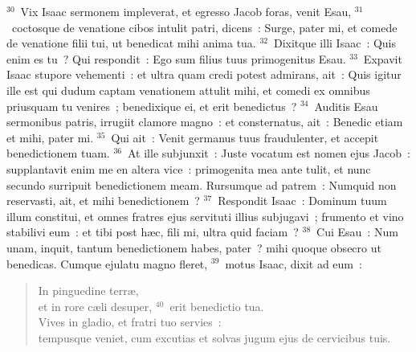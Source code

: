 ${}^{30}$~Vix Isaac sermonem impleverat, et egresso Jacob foras, venit Esau,
${}^{31}$~coctosque de venatione cibos intulit patri, dicens~: Surge, pater mi, et comede de venatione filii tui, ut benedicat mihi anima tua.
${}^{32}$~Dixitque illi Isaac~: Quis enim es tu~? Qui respondit~: Ego sum filius tuus primogenitus Esau.
${}^{33}$~Expavit Isaac stupore vehementi~: et ultra quam credi potest admirans, ait~: Quis igitur ille est qui dudum captam venationem attulit mihi, et comedi ex omnibus priusquam tu venires~; benedixique ei, et erit benedictus~?
${}^{34}$~Auditis Esau sermonibus patris, irrugiit clamore magno~: et consternatus, ait~: Benedic etiam et mihi, pater mi.
${}^{35}$~Qui ait~: Venit germanus tuus fraudulenter, et accepit benedictionem tuam.
${}^{36}$~At ille subjunxit~: Juste vocatum est nomen ejus Jacob~: supplantavit enim me en altera vice~: primogenita mea ante tulit, et nunc secundo surripuit benedictionem meam. Rursumque ad patrem~: Numquid non reservasti, ait, et mihi benedictionem~?
${}^{37}$~Respondit Isaac~: Dominum tuum illum constitui, et omnes fratres ejus servituti illius subjugavi~; frumento et vino stabilivi eum~: et tibi post h\ae c, fili mi, ultra quid faciam~?
${}^{38}$~Cui Esau~: Num unam, inquit, tantum benedictionem habes, pater~? mihi quoque obsecro ut benedicas. Cumque ejulatu magno fleret,
${}^{39}$~motus Isaac, dixit ad eum~: \begin{flushleft}\begin{verse}In pinguedine terr\ae ,\\ et in rore c\ae li desuper,
${}^{40}$~erit benedictio tua.\\ Vives in gladio, et fratri tuo servies~:\\ tempusque veniet, cum excutias et solvas jugum ejus de cervicibus tuis.\end{verse}\end{flushleft}


